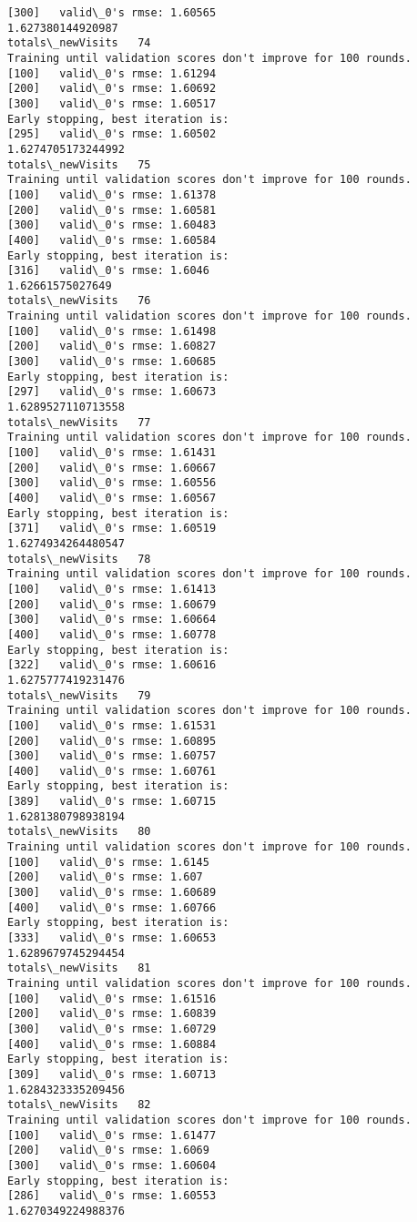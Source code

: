 \documentclass[11pt]{article}
\begin{document}
\begin{Verbatim}[commandchars=\\\{\}]
[300]	valid\_0's rmse: 1.60565
1.627380144920987
totals\_newVisits   74
Training until validation scores don't improve for 100 rounds.
[100]	valid\_0's rmse: 1.61294
[200]	valid\_0's rmse: 1.60692
[300]	valid\_0's rmse: 1.60517
Early stopping, best iteration is:
[295]	valid\_0's rmse: 1.60502
1.6274705173244992
totals\_newVisits   75
Training until validation scores don't improve for 100 rounds.
[100]	valid\_0's rmse: 1.61378
[200]	valid\_0's rmse: 1.60581
[300]	valid\_0's rmse: 1.60483
[400]	valid\_0's rmse: 1.60584
Early stopping, best iteration is:
[316]	valid\_0's rmse: 1.6046
1.62661575027649
totals\_newVisits   76
Training until validation scores don't improve for 100 rounds.
[100]	valid\_0's rmse: 1.61498
[200]	valid\_0's rmse: 1.60827
[300]	valid\_0's rmse: 1.60685
Early stopping, best iteration is:
[297]	valid\_0's rmse: 1.60673
1.6289527110713558
totals\_newVisits   77
Training until validation scores don't improve for 100 rounds.
[100]	valid\_0's rmse: 1.61431
[200]	valid\_0's rmse: 1.60667
[300]	valid\_0's rmse: 1.60556
[400]	valid\_0's rmse: 1.60567
Early stopping, best iteration is:
[371]	valid\_0's rmse: 1.60519
1.6274934264480547
totals\_newVisits   78
Training until validation scores don't improve for 100 rounds.
[100]	valid\_0's rmse: 1.61413
[200]	valid\_0's rmse: 1.60679
[300]	valid\_0's rmse: 1.60664
[400]	valid\_0's rmse: 1.60778
Early stopping, best iteration is:
[322]	valid\_0's rmse: 1.60616
1.6275777419231476
totals\_newVisits   79
Training until validation scores don't improve for 100 rounds.
[100]	valid\_0's rmse: 1.61531
[200]	valid\_0's rmse: 1.60895
[300]	valid\_0's rmse: 1.60757
[400]	valid\_0's rmse: 1.60761
Early stopping, best iteration is:
[389]	valid\_0's rmse: 1.60715
1.6281380798938194
totals\_newVisits   80
Training until validation scores don't improve for 100 rounds.
[100]	valid\_0's rmse: 1.6145
[200]	valid\_0's rmse: 1.607
[300]	valid\_0's rmse: 1.60689
[400]	valid\_0's rmse: 1.60766
Early stopping, best iteration is:
[333]	valid\_0's rmse: 1.60653
1.6289679745294454
totals\_newVisits   81
Training until validation scores don't improve for 100 rounds.
[100]	valid\_0's rmse: 1.61516
[200]	valid\_0's rmse: 1.60839
[300]	valid\_0's rmse: 1.60729
[400]	valid\_0's rmse: 1.60884
Early stopping, best iteration is:
[309]	valid\_0's rmse: 1.60713
1.6284323335209456
totals\_newVisits   82
Training until validation scores don't improve for 100 rounds.
[100]	valid\_0's rmse: 1.61477
[200]	valid\_0's rmse: 1.6069
[300]	valid\_0's rmse: 1.60604
Early stopping, best iteration is:
[286]	valid\_0's rmse: 1.60553
1.6270349224988376

\end{Verbatim}
\end{document}
